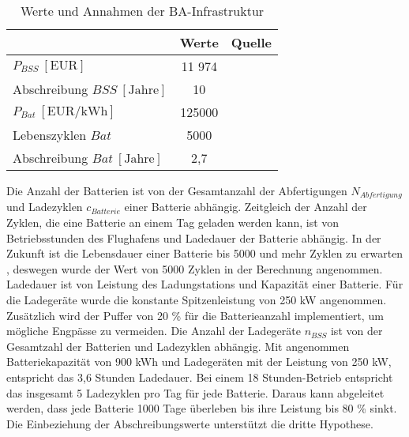 

\begin{table}[h]
	\begin{center}
    \caption{Werte und Annahmen der BA-Infrastruktur}
	\label{BA_Infrastrukturtab}
	\begin{tabular}{|l|c|c|}
		\hline
		 & \textbf{Werte} & \textbf{Quelle} \\ \hline
		$P_{BSS} ~[\text{EUR}]$ &  11 974  & \cite{guo2020aviation} \\ \hline
      Abschreibung $BSS ~[\text{Jahre}]$&  10  & \cite{salucci2020optimal} \\ \hline
		$P_{Bat} ~[\text{EUR/kWh}]$ & 125000 & \cite{guo2020aviation} \\ \hline
      Lebenszyklen $Bat$ & 5000 & \cite{reimers2018introduction} \\ \hline
      Abschreibung $Bat ~[\text{Jahre}]$& 2,7 & \\ \hline

	\end{tabular}
    \end{center}
\end{table}

Die Anzahl der Batterien ist von der Gesamtanzahl der Abfertigungen $N_{Abfertigung}$ und Ladezyklen $c_{Batterie}$ einer Batterie abhängig. 
Zeitgleich der Anzahl der Zyklen, die eine Batterie an einem Tag geladen werden kann, ist von Betriebsstunden des Flughafens und 
Ladedauer der Batterie abhängig. In der Zukunft ist die Lebensdauer einer Batterie bis 5000 und mehr Zyklen zu erwarten \cite{reimers2018introduction}, 
deswegen wurde der Wert von 5000 Zyklen in der Berechnung angenommen.
Ladedauer ist von Leistung des Ladungstations und Kapazität einer Batterie.
Für die Ladegeräte wurde die konstante Spitzenleistung von 250 kW angenommen. %
Zusätzlich wird der Puffer von 20 \% für die Batterieanzahl implementiert, um mögliche Engpässe zu vermeiden. 
Die Anzahl der Ladegeräte $n_{BSS}$ ist von der Gesamtzahl der Batterien und Ladezyklen abhängig.
\cite{salucci2020optimal}
Mit angenommen Batteriekapazität von 900 kWh und Ladegeräten mit der Leistung von 250 kW, entspricht das 3,6 Stunden Ladedauer.
Bei einem 18 Stunden-Betrieb entspricht das insgesamt 5 Ladezyklen pro Tag für jede Batterie. Daraus kann abgeleitet werden, dass
jede Batterie 1000 Tage überleben bis ihre Leistung bis 80 \% sinkt.
Die Einbeziehung der Abschreibungswerte unterstützt die dritte Hypothese.

